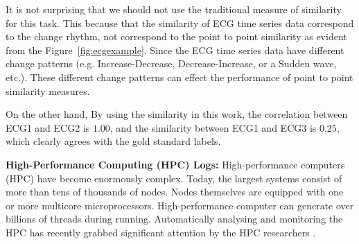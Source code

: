 It is not surprising that we should not use the traditional measure of similarity for this task. This because that the similarity of ECG time series data correspond to the change rhythm, not correspond to the point to point similarity as evident from the Figure~\ref{fig:ecgexample}.
Since the ECG time series data have different change patterns (e.g. Increase-Decrease, Decrease-Increase, or a Sudden wave, etc.). These different change patterns can effect the performance of point to point similarity measures.

On the other hand, By using the similarity in this work, the correlation between ECG1 and ECG2 is $1.00$, and the similarity between ECG1 and ECG3 is $0.25$, which clearly agrees with the gold standard labels.

%








\textbf{High-Performance Computing (HPC) Logs:} High-performance computers (HPC) have become enormously complex. Today, the largest systems consist of more than tens of thousands of nodes. Nodes themselves are equipped with one or more multicore microprocessors\cite{adhianto2010hpctoolkit}. High-performance computer can generate over billions of threads during running.
Automatically analysing and monitoring the HPC has recently grabbed significant attention by the HPC researchers \cite{mccurdy2010memphis,tallent2009effective}.

